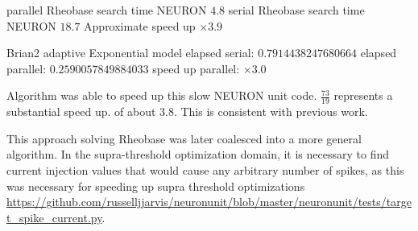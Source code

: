 parallel Rheobase search time NEURON  $4.8$
serial Rheobase search time NEURON  $18.7$
Approximate speed up $\times 3.9$

Brian2 adaptive Exponential model   
elapsed serial:  $0.7914438247680664$
elapsed parallel: $ 0.2590057849884033$
speed up parallel:   $\times 3.0$

Algorithm was able to speed up this slow NEURON unit code. $ \frac{73}{19} $ represents a substantial speed up. of about 3.8. This is consistent with previous work.

This approach solving Rheobase was later coalesced into a more general algorithm. In the supra-threshold optimization domain, it is necessary to find current injection values that would cause any arbitrary number of spikes, as this was necessary for speeding up supra threshold optimizations \url{https://github.com/russelljjarvis/neuronunit/blob/master/neuronunit/tests/target_spike_current.py}.

 